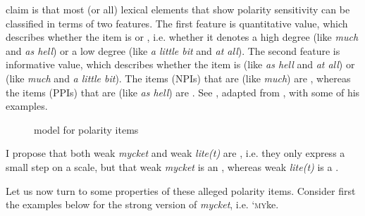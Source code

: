 \documentclass[output=paper]{langscibook}
\begin{document}
 claim is that most (or all) lexical elements that show polarity sensitivity can be classified in terms of two features. The first feature is quantitative value, which describes whether the item is  or , i.e. whether it denotes a high degree (like \textit{much} and \textit{as hell}) or a low degree (like \textit{a little bit} and \textit{at all}). The second feature is informative value, which describes whether the item is  (like \textit{as hell} and \textit{at all}) or  (like \textit{much} and \textit{a little bit}). The  items (NPIs) that are  (like \textit{much}) are , whereas the  items (PPIs) that are  (like \textit{as hell}) are . See , adapted from \citet[628]{Israel1996}, with some of his examples.



\begin{figure}
\caption{ model for polarity items\label{fig:delsing:1}}
\end{figure}


I propose that both weak \textit{mycket} and weak \textit{lite(t)} are , i.e. they only express a small step on a scale, but that weak \textit{mycket} is an , whereas weak \textit{lite(t)} is a .



Let us now turn to some properties of these alleged polarity items. Consider first the examples below for the strong version of \textit{mycket}, i.e. ‘\textsc{my}ke.
\end{document}
